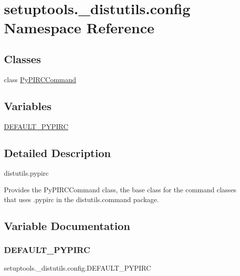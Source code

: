 \hypertarget{namespacesetuptools_1_1__distutils_1_1config}{}\section{setuptools.\+\_\+distutils.\+config Namespace Reference}
\label{namespacesetuptools_1_1__distutils_1_1config}
\subsection*{Classes}
\begin{DoxyCompactItemize}
\item 
class \hyperlink{classsetuptools_1_1__distutils_1_1config_1_1PyPIRCCommand}{Py\+P\+I\+R\+C\+Command}
\end{DoxyCompactItemize}
\subsection*{Variables}
\begin{DoxyCompactItemize}
\item 
\hyperlink{namespacesetuptools_1_1__distutils_1_1config_a3617be077af55625944da85384165258}{D\+E\+F\+A\+U\+L\+T\+\_\+\+P\+Y\+P\+I\+RC}
\end{DoxyCompactItemize}


\subsection{Detailed Description}
\begin{DoxyVerb}distutils.pypirc

Provides the PyPIRCCommand class, the base class for the command classes
that uses .pypirc in the distutils.command package.
\end{DoxyVerb}
 

\subsection{Variable Documentation}
\mbox{\label{namespacesetuptools_1_1__distutils_1_1config_a3617be077af55625944da85384165258}} 
\subsubsection{\texorpdfstring{D\+E\+F\+A\+U\+L\+T\+\_\+\+P\+Y\+P\+I\+RC}{DEFAULT\_PYPIRC}}
{\footnotesize\ttfamily setuptools.\+\_\+distutils.\+config.\+D\+E\+F\+A\+U\+L\+T\+\_\+\+P\+Y\+P\+I\+RC}

